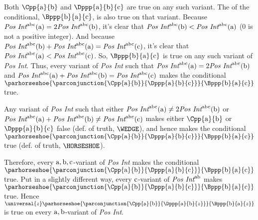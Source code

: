 \begin{PROOF}
Both $\Cpp{\constant{a}}{\constant{b}}$ and $\Dppp{\constant{a}}{\constant{b}}{\constant{c}}$ are true on any such variant. The  of the conditional, $\Bppp{\constant{b}}{\constant{a}}{\constant{c}}$, is also true on that variant.  Because $\emph{Pos Int}^{\mathrm{a}\mathrm{b}\mathrm{c}}(\mathrm{a})=2\emph{Pos Int}^{\mathrm{a}\mathrm{b}\mathrm{c}}(\mathrm{b})$, it's clear that $\emph{Pos Int}^{\mathrm{a}\mathrm{b}\mathrm{c}}(\mathrm{b})<\emph{Pos Int}^{\mathrm{a}\mathrm{b}\mathrm{c}}(\mathrm{a})$ (0 is not a positive integer). 
And because $\emph{Pos Int}^{\mathrm{a}\mathrm{b}\mathrm{c}}(\mathrm{b})+\emph{Pos Int}^{\mathrm{a}\mathrm{b}\mathrm{c}}(\mathrm{a})=\emph{Pos Int}^{\mathrm{a}\mathrm{b}\mathrm{c}}(\mathrm{c})$, it's clear that $\emph{Pos Int}^{\mathrm{a}\mathrm{b}\mathrm{c}}(\mathrm{a})<\emph{Pos Int}^{\mathrm{a}\mathrm{b}\mathrm{c}}(\mathrm{c})$.
So, $\Bppp{\constant{b}}{\constant{a}}{\constant{c}}$ is true on any such variant of \emph{Pos Int}.
Thus, every variant of \emph{Pos Int} such that $\emph{Pos Int}^{\mathrm{a}\mathrm{b}\mathrm{c}}(\mathrm{a})=2\emph{Pos Int}^{\mathrm{a}\mathrm{b}\mathrm{c}}(\mathrm{b})$ and $\emph{Pos Int}^{\mathrm{a}\mathrm{b}\mathrm{c}}(\mathrm{a})+\emph{Pos Int}^{\mathrm{a}\mathrm{b}\mathrm{c}}(\mathrm{b})=\emph{Pos Int}^{\mathrm{a}\mathrm{b}\mathrm{c}}(\mathrm{c})$ makes the conditional $\parhorseshoe{\parconjunction{\Cpp{\constant{a}}{\constant{b}}}{\Dppp{\constant{a}}{\constant{b}}{\constant{c}}}}{\Bppp{\constant{b}}{\constant{a}}{\constant{c}}}$ true. 

Any variant of \emph{Pos Int} such that either $\emph{Pos Int}^{\mathrm{a}\mathrm{b}\mathrm{c}}(\mathrm{a})\neq{}2\emph{Pos Int}^{\mathrm{a}\mathrm{b}\mathrm{c}}(\mathrm{b})$ or $\emph{Pos Int}^{\mathrm{a}\mathrm{b}\mathrm{c}}(\mathrm{a})+\emph{Pos Int}^{\mathrm{a}\mathrm{b}\mathrm{c}}(\mathrm{b})\neq{}\emph{Pos Int}^{\mathrm{a}\mathrm{b}\mathrm{c}}(\mathrm{c})$ makes either  $\Cpp{\constant{a}}{\constant{b}}$ or $\Dppp{\constant{a}}{\constant{b}}{\constant{c}}$ false (def. of truth, $\WEDGE$), and hence makes the conditional $\parhorseshoe{\parconjunction{\Cpp{\constant{a}}{\constant{b}}}{\Dppp{\constant{a}}{\constant{b}}{\constant{c}}}}{\Bppp{\constant{b}}{\constant{a}}{\constant{c}}}$ true (def. of truth, $\HORSESHOE$).

Therefore, every $\mathrm{a},\mathrm{b},\mathrm{c}$-variant of \emph{Pos Int} makes the conditional $\parhorseshoe{\parconjunction{\Cpp{\constant{a}}{\constant{b}}}{\Dppp{\constant{a}}{\constant{b}}{\constant{c}}}}{\Bppp{\constant{b}}{\constant{a}}{\constant{c}}}$ true. Put in a slightly different way, every $\mathrm{c}$-variant of $\emph{Pos Int}^{\mathrm{a}\mathrm{b}}$ makes $\parhorseshoe{\parconjunction{\Cpp{\constant{a}}{\constant{b}}}{\Dppp{\constant{a}}{\constant{b}}{\constant{c}}}}{\Bppp{\constant{b}}{\constant{a}}{\constant{c}}}$ true.  Hence $\universal{\variable{z}}\parhorseshoe{\parconjunction{\Cpp{\constant{a}}{\constant{b}}}{\Dppp{\constant{a}}{\constant{b}}{\variable{z}}}}{\Bppp{\constant{b}}{\constant{a}}{\variable{z}}}$ is true on every $\mathrm{a},\mathrm{b}$-variant of \emph{Pos Int}. 


\end{PROOF}

